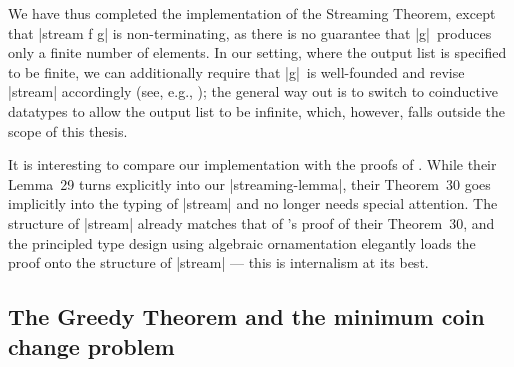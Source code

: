 We have thus completed the implementation of the Streaming Theorem, except that |stream f g| is non-terminating, as there is no guarantee that |g|~produces only a finite number of elements.
In our setting, where the output list is specified to be finite, we can additionally require that |g|~is well-founded and revise |stream| accordingly (see, e.g., \citet{Nordstrom-accessibility}); the general way out is to switch to coinductive datatypes to allow the output list to be infinite, which, however, falls outside the scope of this thesis.

It is interesting to compare our implementation with the proofs of \citet{Bird-arithmetic-coding}.
While their Lemma~29 turns explicitly into our |streaming-lemma|, their Theorem~30 goes implicitly into the typing of |stream| and no longer needs special attention.
The structure of |stream| already matches that of \citeauthor{Bird-arithmetic-coding}'s proof of their Theorem~30, and the principled type design using algebraic ornamentation elegantly loads the proof onto the structure of |stream| --- this is internalism at its best.

\subsection{The Greedy Theorem and the minimum coin change problem}
\label{sec:minimum-coin-change}

